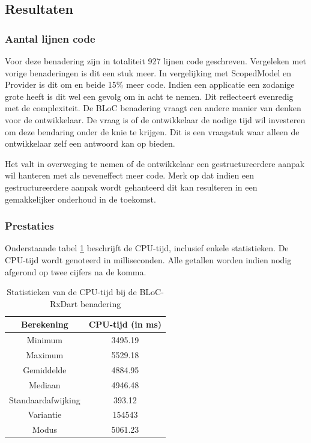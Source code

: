 \subsection{Resultaten}
\subsubsection{Aantal lijnen code}
Voor deze benadering zijn in totaliteit 927 lijnen code geschreven. Vergeleken met vorige benaderingen is dit een stuk meer. In vergelijking met ScopedModel en Provider is dit om en beide 15\% meer code. Indien een applicatie een zodanige grote heeft is dit wel een gevolg om in acht te nemen. Dit reflecteert evenredig met de complexiteit. De BLoC benadering vraagt een andere manier van denken voor de ontwikkelaar. De vraag is of de ontwikkelaar de nodige tijd wil investeren om deze bendaring onder de knie te krijgen. Dit is een vraagstuk waar alleen de ontwikkelaar zelf een antwoord kan op bieden.

Het valt in overweging te nemen of de ontwikkelaar een gestructureerdere aanpak wil hanteren met als neveneffect meer code. Merk op dat indien een gestructureerdere aanpak wordt gehanteerd dit kan resulteren in een gemakkelijker onderhoud in de toekomst. 
\subsubsection{Prestaties}
Onderstaande tabel \ref{table:experiment-bloc-rxdart-statistics} beschrijft de CPU-tijd, inclusief enkele statistieken. De CPU-tijd wordt genoteerd in milliseconden. Alle getallen worden indien nodig afgerond op twee cijfers na de komma.
\begin{table}[H]
    \centering
    \begin{tabular}{c|c}
        \textbf{Berekening} & \textbf{CPU-tijd (in ms)}  \\ \hline
        Minimum             & 3495.19                    \\ \hline
        Maximum             & 5529.18                    \\ \hline
        Gemiddelde          & 4884.95                    \\ \hline
        Mediaan             & 4946.48                    \\ \hline
        Standaardafwijking  & 393.12                     \\ \hline
        Variantie           & 154543                     \\ \hline
        Modus               & 5061.23                      \\                
    \end{tabular}
    \caption{Statistieken van de CPU-tijd bij de BLoC-RxDart benadering}
    \label{table:experiment-bloc-rxdart-statistics}
\end{table}

